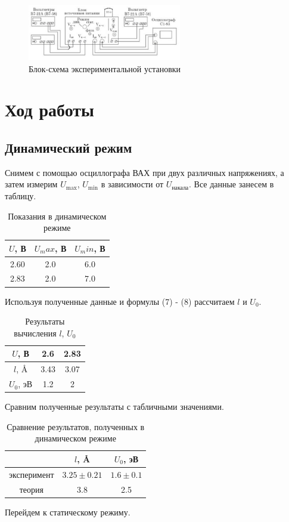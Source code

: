 \documentclass[a4paper,12pt]{article} %
\begin{document}
	\begin{figure}[H]
		\begin{center}
			\includegraphics[width = 0.6\textwidth]{3.jpg}
			\caption{Блок-схема экспериментальной установки}
		\end{center}
	\end{figure}
	\section*{Ход работы}
	\subsection*{Динамический режим}
	Снимем с помощью осциллографа ВАХ при двух различных напряжениях, а затем измерим $U_{\max}$, $U_{\min}$ в зависимости от $U_{\text{накала}}$. Все данные занесем в таблицу.
	\begin{table}[H]
		\centering
		\begin{tabular}{|c|c|c|}
			\hline
			$U$, В & $U_max$, В & $U_min$, В \\ \hline
			2.60 & 2.0       & 6.0       \\ \hline
			2.83 & 2.0       & 7.0       \\ \hline
		\end{tabular}
		\caption{Показания в динамическом режиме}
	\end{table}
	Используя полученные данные и формулы (7) - (8) рассчитаем $l$ и $U_0$.
	\begin{table}[H]
		\centering
		\begin{tabular}{|c|c|c|}
			\hline
			$U$, В     & 2.6  & 2.83 \\ \hline
			$l$, \r{A}  & 3.43 & 3.07 \\ \hline
			$U_0$, эВ & 1.2  & 2    \\ \hline
		\end{tabular}
		\caption{Результаты вычисления $l$, $U_0$}
	\end{table}
	Сравним полученные результаты с табличными значениями.
	\begin{table}[H]
		\centering
		\begin{tabular}{|c|c|c|}
			\hline
			& $l$, \r{A}      & $U_0$, эВ   \\ \hline
			эксперимент & $3.25 \pm 0.21$ & $1.6 \pm 0.1$ \\ \hline
			теория      & 3.8       & 2.5        \\ \hline
		\end{tabular}
	\caption{Сравнение результатов, полученных в динамическом режиме}
	\end{table}
	Перейдем к статическому режиму.
\end{document}
